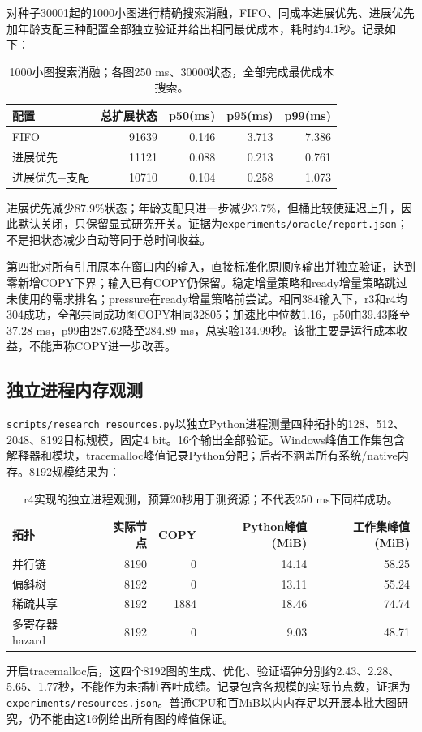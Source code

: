 \documentclass[UTF8,11pt,fontset=fandol]{ctexart}
\begin{document}
对种子30001起的1000小图进行精确搜索消融，FIFO、同成本进展优先、进展优先加年龄支配三种配置全部独立验证并给出相同最优成本，耗时约4.1秒。记录如下：
\begin{table}[htbp]\centering\small
\begin{tabular}{lrrrr}\toprule
配置 & 总扩展状态 & p50(ms)&p95(ms)&p99(ms)\\\midrule
FIFO &91639&0.146&3.713&7.386\\
进展优先 &11121&0.088&0.213&0.761\\
进展优先+支配 &10710&0.104&0.258&1.073\\\bottomrule
\end{tabular}\caption{1000小图搜索消融；各图250 ms、30000状态，全部完成最优成本搜索。}\end{table}
进展优先减少87.9\%状态；年龄支配只进一步减少3.7\%，但桶比较使延迟上升，因此默认关闭，只保留显式研究开关。证据为\texttt{experiments/oracle/report.json}；不是把状态减少自动等同于总时间收益。

第四批对所有引用原本在窗口内的输入，直接标准化原顺序输出并独立验证，达到零新增COPY下界；输入已有COPY仍保留。稳定增量策略和ready增量策略跳过未使用的需求排名；pressure在ready增量策略前尝试。相同384输入下，r3和r4均304成功，全部共同成功图COPY相同32805；加速比中位数1.16，p50由39.43降至37.28 ms，p99由287.62降至284.89 ms，总实验134.99秒。该批主要是运行成本收益，不能声称COPY进一步改善。

\subsection{独立进程内存观测}
\texttt{scripts/research\_resources.py}以独立Python进程测量四种拓扑的128、512、2048、8192目标规模，固定4 bit。16个输出全部验证。Windows峰值工作集包含解释器和模块，tracemalloc峰值记录Python分配；后者不涵盖所有系统/native内存。8192规模结果为：
\begin{table}[htbp]\centering\small
\begin{tabular}{lrrrr}\toprule
拓扑 & 实际节点 & COPY & Python峰值(MiB)&工作集峰值(MiB)\\\midrule
并行链 &8190&0&14.14&58.25\\
偏斜树 &8192&0&13.11&55.24\\
稀疏共享 &8192&1884&18.46&74.74\\
多寄存器hazard &8192&0&9.03&48.71\\\bottomrule
\end{tabular}\caption{r4实现的独立进程观测，预算20秒用于测资源；不代表250 ms下同样成功。}\end{table}
开启tracemalloc后，这四个8192图的生成、优化、验证墙钟分别约2.43、2.28、5.65、1.77秒，不能作为未插桩吞吐成绩。记录包含各规模的实际节点数，证据为\texttt{experiments/resources.json}。普通CPU和百MiB以内内存足以开展本批大图研究，仍不能由这16例给出所有图的峰值保证。
\end{document}
